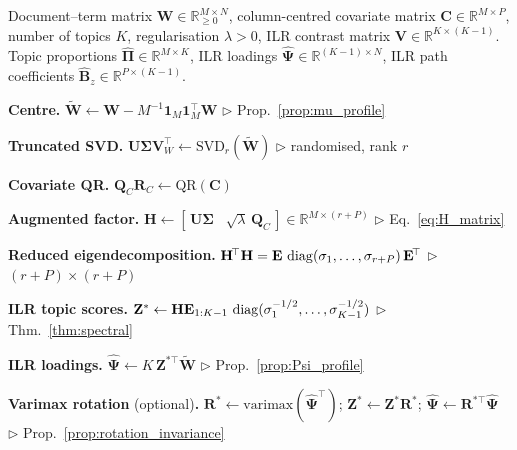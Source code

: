 \begin{algorithm}[h]
\caption{ILR-Spectral-GSCA Spectral Fit}
\label{(alg:ilr_spectral_gsca)}
\begin{algorithmic}[1]
\REQUIRE Document--term matrix
  $\mathbf{W}\in\mathbb{R}^{M\times N}_{\geq 0}$,
  column-centred covariate matrix
  $\mathbf{C}\in\mathbb{R}^{M\times P}$,
  number of topics $K$,
  regularisation $\lambda>0$,
  ILR contrast matrix
  $\mathbf{V}\in\mathbb{R}^{K\times(K-1)}$.
\ENSURE Topic proportions $\hat{\boldsymbol{\Pi}}\in\mathbb{R}^{M\times K}$,
  ILR loadings $\hat{\boldsymbol{\Psi}}\in\mathbb{R}^{(K-1)\times N}$,
  ILR path coefficients $\hat{\mathbf{B}}_z\in\mathbb{R}^{P\times(K-1)}$.

\medskip
\STATE \textbf{Centre.}\;
  $\widetilde{\mathbf{W}} \leftarrow \mathbf{W}
    - M^{-1}\mathbf{1}_M\mathbf{1}_M^{\!\top}\mathbf{W}$
  \hfill$\triangleright$ Prop.~\ref{prop:mu_profile}

\STATE \textbf{Truncated SVD.}\;
  $\mathbf{U}\boldsymbol{\Sigma}\mathbf{V}_W^{\!\top}
    \leftarrow \text{SVD}_r(\widetilde{\mathbf{W}})$
  \hfill$\triangleright$ randomised, rank $r$

\STATE \textbf{Covariate QR.}\;
  $\mathbf{Q}_C\mathbf{R}_C \leftarrow \text{QR}(\mathbf{C})$

\STATE \textbf{Augmented factor.}\;
  $\mathbf{H} \leftarrow [\,\mathbf{U}\boldsymbol{\Sigma}
    \;\;\;\sqrt{\lambda}\,\mathbf{Q}_C\,]
    \in\mathbb{R}^{M\times(r+P)}$
  \hfill$\triangleright$ Eq.~\eqref{eq:H_matrix}

\STATE \textbf{Reduced eigendecomposition.}\;
  $\mathbf{H}^{\!\top}\mathbf{H}
    = \mathbf{E}\,\operatorname{diag}(\sigma_1,\dots,\sigma_{r+P})\,
      \mathbf{E}^{\!\top}$
  \hfill$\triangleright$ $(r{+}P)\times(r{+}P)$

\STATE \textbf{ILR topic scores.}\;
  $\mathbf{Z}^* \leftarrow \mathbf{H}\mathbf{E}_{1:K-1}\,
    \operatorname{diag}(\sigma_1^{-1/2},\dots,\sigma_{K-1}^{-1/2})$
  \hfill$\triangleright$ Thm.~\ref{thm:spectral}

\STATE \textbf{ILR loadings.}\;
  $\hat{\boldsymbol{\Psi}} \leftarrow
    K\,\mathbf{Z}^{*\top}\widetilde{\mathbf{W}}$
  \hfill$\triangleright$ Prop.~\ref{prop:Psi_profile}

\STATE \textbf{Varimax rotation} (optional)\textbf{.}\;
  $\mathbf{R}^* \leftarrow \mathrm{varimax}
    (\hat{\boldsymbol{\Psi}}^{\!\top})$;\;
  $\mathbf{Z}^* \leftarrow \mathbf{Z}^*\mathbf{R}^*$;\;
  $\hat{\boldsymbol{\Psi}} \leftarrow
    \mathbf{R}^{*\top}\hat{\boldsymbol{\Psi}}$
  \hfill$\triangleright$ Prop.~\ref{prop:rotation_invariance}


\end{algorithmic}
\end{algorithm}
